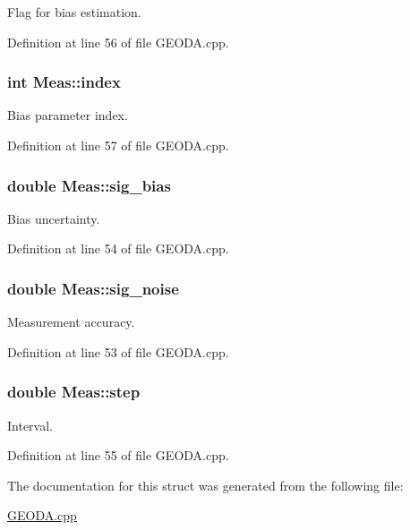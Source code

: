 Flag for bias estimation. 



Definition at line 56 of file G\-E\-O\-D\-A.\-cpp.

\hypertarget{structMeas_a7a3aa7407c590962408fb450a57386e4}{
\subsubsection[{index}]{\setlength{\rightskip}{0pt plus 5cm}int Meas\-::index}}\label{structMeas_a7a3aa7407c590962408fb450a57386e4}


Bias parameter index. 



Definition at line 57 of file G\-E\-O\-D\-A.\-cpp.

\hypertarget{structMeas_a754e86a093393d785b30f9d1cdcbef4c}{
\subsubsection[{sig\-\_\-bias}]{\setlength{\rightskip}{0pt plus 5cm}double Meas\-::sig\-\_\-bias}}\label{structMeas_a754e86a093393d785b30f9d1cdcbef4c}


Bias uncertainty. 



Definition at line 54 of file G\-E\-O\-D\-A.\-cpp.

\hypertarget{structMeas_a16daa8cf217c6d2a09b63725c9e9f1b4}{
\subsubsection[{sig\-\_\-noise}]{\setlength{\rightskip}{0pt plus 5cm}double Meas\-::sig\-\_\-noise}}\label{structMeas_a16daa8cf217c6d2a09b63725c9e9f1b4}


Measurement accuracy. 



Definition at line 53 of file G\-E\-O\-D\-A.\-cpp.

\hypertarget{structMeas_ab350e1dba80e64fe121f5bbed646a05c}{
\subsubsection[{step}]{\setlength{\rightskip}{0pt plus 5cm}double Meas\-::step}}\label{structMeas_ab350e1dba80e64fe121f5bbed646a05c}


Interval. 



Definition at line 55 of file G\-E\-O\-D\-A.\-cpp.



The documentation for this struct was generated from the following file\-:\begin{DoxyCompactItemize}
\item 
\hyperlink{GEODA_8cpp}{G\-E\-O\-D\-A.\-cpp}\end{DoxyCompactItemize}
